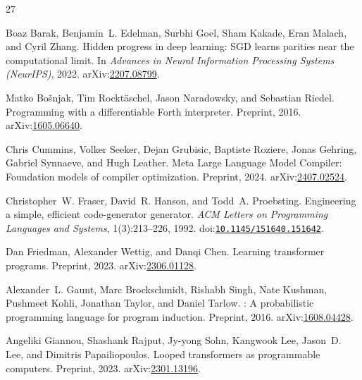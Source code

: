 \documentclass[11pt]{article}
\begin{document}
\begin{thebibliography}{27}
\providecommand{\natexlab}[1]{#1}
\providecommand{\arxiv}[1]{arXiv:\href{https://arxiv.org/abs/#1}{#1}}
\providecommand{\doi}[1]{doi:\href{https://doi.org/#1}{\nolinkurl{#1}}}

Boaz Barak, Benjamin~L. Edelman, Surbhi Goel, Sham Kakade, Eran Malach, and Cyril Zhang.
\newblock Hidden progress in deep learning: {SGD} learns parities near the computational limit.
\newblock In \emph{Advances in Neural Information Processing Systems (NeurIPS)}, 2022.
\newblock \arxiv{2207.08799}.

Matko Bo{\v{s}}njak, Tim Rockt{\"a}schel, Jason Naradowsky, and Sebastian Riedel.
\newblock Programming with a differentiable {Forth} interpreter.
\newblock Preprint, 2016.
\newblock \arxiv{1605.06640}.

Chris Cummins, Volker Seeker, Dejan Grubisic, Baptiste Roziere, Jonas Gehring, Gabriel Synnaeve, and Hugh Leather.
\newblock Meta {Large Language Model Compiler}: Foundation models of compiler optimization.
\newblock Preprint, 2024.
\newblock \arxiv{2407.02524}.

Christopher~W. Fraser, David~R. Hanson, and Todd~A. Proebsting.
\newblock Engineering a simple, efficient code-generator generator.
\newblock \emph{ACM Letters on Programming Languages and Systems}, 1(3):213--226, 1992.
\newblock \doi{10.1145/151640.151642}.

Dan Friedman, Alexander Wettig, and Danqi Chen.
\newblock Learning transformer programs.
\newblock Preprint, 2023.
\newblock \arxiv{2306.01128}.

Alexander~L. Gaunt, Marc Brockschmidt, Rishabh Singh, Nate Kushman, Pushmeet Kohli, Jonathan Taylor, and Daniel Tarlow.
: A probabilistic programming language for program induction.
\newblock Preprint, 2016.
\newblock \arxiv{1608.04428}.

Angeliki Giannou, Shashank Rajput, Jy-yong Sohn, Kangwook Lee, Jason~D. Lee, and Dimitris Papailiopoulos.
\newblock Looped transformers as programmable computers.
\newblock Preprint, 2023.
\newblock \arxiv{2301.13196}.


\end{thebibliography}
\end{document}
